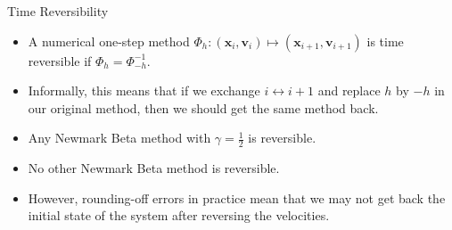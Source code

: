 \documentclass{beamer}
\renewcommand{\vec}[1]{\mathbf{#1}}
\begin{document}
\begin{frame}{Time Reversibility}
\begin{itemize}
	\item
	A numerical one-step method $\Phi_{h}: (\vec{x}_{i},\vec{v}_{i}) \mapsto (\vec{x}_{i+1},\vec{v}_{i+1})$ is time reversible if $\Phi_{h} = \Phi_{-h}^{-1}$.
	\item
	Informally, this means that if we exchange $i \leftrightarrow i+1$ and replace $h$ by $-h$ in our original method, then we should get the same method back.
	\item
	Any Newmark Beta method with $\gamma = \frac{1}{2}$  is reversible.
	\item	
	No other Newmark Beta method is reversible.
	\item
	However, rounding-off errors in practice mean that we may not get back the initial state of the system after reversing the velocities.
\end{itemize}
\end{frame}
\end{document}
